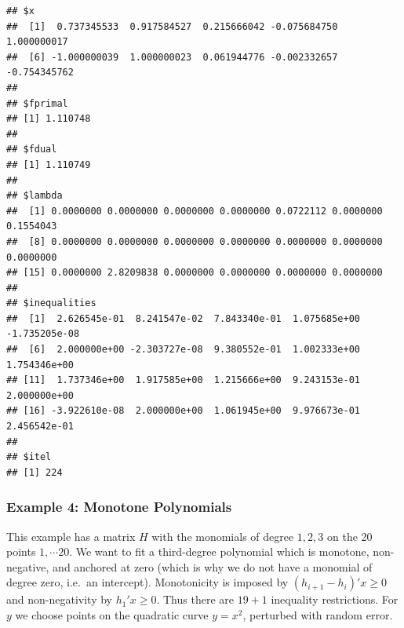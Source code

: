 \documentclass[
  12pt,
]{book}
\theoremstyle{definition}
\theoremstyle{definition}
\theoremstyle{definition}
\theoremstyle{definition}
\theoremstyle{remark}
\begin{document}
\begin{verbatim}
## $x
##  [1]  0.737345533  0.917584527  0.215666042 -0.075684750  1.000000017
##  [6] -1.000000039  1.000000023  0.061944776 -0.002332657 -0.754345762
## 
## $fprimal
## [1] 1.110748
## 
## $fdual
## [1] 1.110749
## 
## $lambda
##  [1] 0.0000000 0.0000000 0.0000000 0.0000000 0.0722112 0.0000000 0.1554043
##  [8] 0.0000000 0.0000000 0.0000000 0.0000000 0.0000000 0.0000000 0.0000000
## [15] 0.0000000 2.8209838 0.0000000 0.0000000 0.0000000 0.0000000
## 
## $inequalities
##  [1]  2.626545e-01  8.241547e-02  7.843340e-01  1.075685e+00 -1.735205e-08
##  [6]  2.000000e+00 -2.303727e-08  9.380552e-01  1.002333e+00  1.754346e+00
## [11]  1.737346e+00  1.917585e+00  1.215666e+00  9.243153e-01  2.000000e+00
## [16] -3.922610e-08  2.000000e+00  1.061945e+00  9.976673e-01  2.456542e-01
## 
## $itel
## [1] 224
\end{verbatim}

\hypertarget{example-4-monotone-polynomials}{%
\subsubsection{Example 4: Monotone Polynomials}\label{example-4-monotone-polynomials}}

This example has a matrix \(H\) with the monomials of degree \(1,2,3\) on the 20 points
\(1,\cdots 20\). We want to fit a third-degree polynomial which is monotone, non-negative, and anchored at zero (which is why we do not have a monomial of degree zero, i.e.~an intercept). Monotonicity is imposed by \((h_{i+1}-h_{i})'x\geq 0\) and non-negativity by \(h_1'x\geq 0\). Thus there are \(19+1\) inequality restrictions. For \(y\) we choose points on the quadratic curve \(y=x^2\), perturbed with random error.
\end{document}
